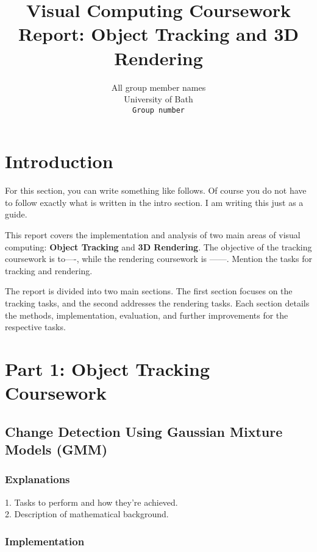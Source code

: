 \documentclass[10pt,twocolumn,letterpaper]{article}
\title{Visual Computing Coursework Report: Object Tracking and 3D Rendering}
\author{All group member names \\
University of Bath \\
{\tt\small Group number}
}
\date{}
\begin{document}
\maketitle

\section{Introduction}
For this section, you can write something like follows. Of course you do not have to follow exactly what is written in the intro section. I am writing this just as a guide. 

This report covers the implementation and analysis of two main areas of visual computing: \textbf{Object Tracking} and \textbf{3D Rendering}. The objective of the tracking coursework is to----, while the rendering coursework is ------. Mention the tasks for tracking and rendering.

The report is divided into two main sections. The first section focuses on the tracking tasks, and the second addresses the rendering tasks. Each section details the methods, implementation, evaluation, and further improvements for the respective tasks.

\section{Part 1: Object Tracking Coursework}

\subsection{Change Detection Using Gaussian Mixture Models (GMM)}
\subsubsection{Explanations}
1. Tasks to perform and how they're achieved. \\
2. Description of mathematical background.

\subsubsection{Implementation}

\end{document}

